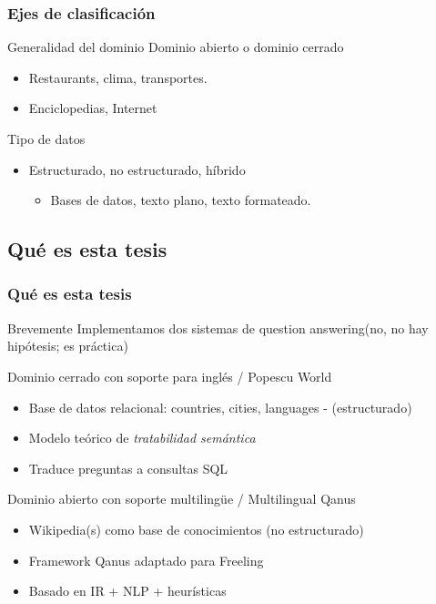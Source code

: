 \begin{frame}
  \frametitle{Ejes de clasificación}
  \begin{block}{Generalidad del dominio}
    Dominio abierto o dominio cerrado
    \begin{itemize} 
      \item Restaurants, clima, transportes.
      \item Enciclopedias, Internet
    \end{itemize}
  \end{block}


  \begin{block}{Tipo de datos}
    \begin{itemize}
      \item Estructurado, no estructurado, híbrido
      \begin{itemize}
          \item Bases de datos, texto plano, texto formateado.
      \end{itemize}
    \end{itemize}
  \end{block}
\end{frame}


\subsection{Qué es esta tesis}

\begin{frame}[<+->]\fontsize{11pt}{11}\selectfont
  \frametitle{Qué es esta tesis}
    \begin{block}{Brevemente}
      Implementamos dos sistemas de question answering\newline(no, no hay hipótesis; es práctica)
    \end{block}
    \begin{exampleblock}{Dominio cerrado con soporte para inglés / Popescu World}
      \begin{itemize}
          \item Base de datos relacional: countries, cities, languages - (estructurado)
          \item Modelo teórico de \textit{tratabilidad semántica}
          \item Traduce preguntas a consultas SQL
      \end{itemize}
    \end{exampleblock}
    \begin{alertblock}{Dominio abierto con soporte multilingüe / Multilingual Qanus}
      \begin{itemize}
          \item Wikipedia(s) como base de conocimientos (no estructurado)
          \item Framework Qanus adaptado para Freeling
          \item Basado en IR + NLP + heurísticas
      \end{itemize}
    \end{alertblock}
\end{frame}